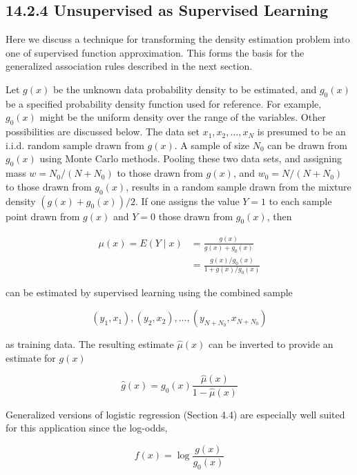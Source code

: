 \documentclass[10pt]{article}
\begin{document}
\subsection*{14.2.4 Unsupervised as Supervised Learning}
Here we discuss a technique for transforming the density estimation problem into one of supervised function approximation. This forms the basis for the generalized association rules described in the next section.

Let $g(x)$ be the unknown data probability density to be estimated, and $g_{0}(x)$ be a specified probability density function used for reference. For example, $g_{0}(x)$ might be the uniform density over the range of the variables. Other possibilities are discussed below. The data set $x_{1}, x_{2}, \ldots, x_{N}$ is presumed to be an i.i.d. random sample drawn from $g(x)$. A sample of size $N_{0}$ can be drawn from $g_{0}(x)$ using Monte Carlo methods. Pooling these two data sets, and assigning mass $w=N_{0} /\left(N+N_{0}\right)$ to those drawn from $g(x)$, and $w_{0}=N /\left(N+N_{0}\right)$ to those drawn from $g_{0}(x)$, results in a random sample drawn from the mixture density $\left(g(x)+g_{0}(x)\right) / 2$. If one assigns the value $Y=1$ to each sample point drawn from $g(x)$ and $Y=0$ those drawn from $g_{0}(x)$, then


\begin{align*}
\mu(x)=E(Y \mid x) & =\frac{g(x)}{g(x)+g_{0}(x)} \\
& =\frac{g(x) / g_{0}(x)}{1+g(x) / g_{0}(x)} \tag{14.10}
\end{align*}


can be estimated by supervised learning using the combined sample


\begin{equation*}
\left(y_{1}, x_{1}\right),\left(y_{2}, x_{2}\right), \ldots,\left(y_{N+N_{0}}, x_{N+N_{0}}\right) \tag{14.11}
\end{equation*}


as training data. The resulting estimate $\hat{\mu}(x)$ can be inverted to provide an estimate for $g(x)$


\begin{equation*}
\hat{g}(x)=g_{0}(x) \frac{\hat{\mu}(x)}{1-\hat{\mu}(x)} \tag{14.12}
\end{equation*}


Generalized versions of logistic regression (Section 4.4) are especially well suited for this application since the log-odds,


\begin{equation*}
f(x)=\log \frac{g(x)}{g_{0}(x)} \tag{14.13}
\end{equation*}
\end{document}
